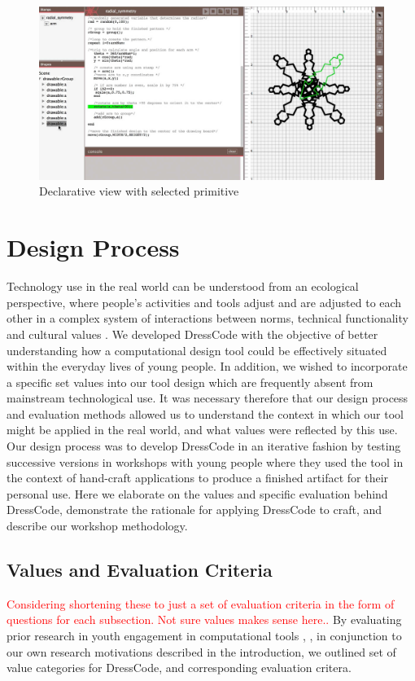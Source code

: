 \documentclass{sigchi}
\begin{document}
\begin{center}
\begin{figure}[h!]
\includegraphics[width=\columnwidth]{images/selection_mechanism.jpg}
\caption{Declarative view with selected primitive}
\label{fig:declarative_view}
\end{figure}
\end{center}
\vspace{-20pt}

\section{Design Process}
 Technology use in the real world can be understood from an ecological perspective, where people's activities and tools adjust and are adjusted to each other in a complex system of interactions between norms, technical functionality and cultural values \cite{information_ecologies}. We developed DressCode with the objective of better understanding how a computational design tool could be effectively situated within the everyday lives of young people. In addition, we wished to incorporate a specific set values into our tool design which are frequently absent from mainstream technological use. It was necessary therefore that our design process and evaluation methods allowed us to understand the context in which our tool might be applied in the real world, and what values were reflected by this use. Our design process was to develop DressCode in an iterative fashion by testing successive versions in workshops with young people where they used the tool in the context of hand-craft applications to produce a finished artifact for their personal use. Here we elaborate on the values and specific evaluation behind DressCode, demonstrate the rationale for applying DressCode to craft, and describe our workshop methodology.

\subsection{Values and Evaluation Criteria}
\textcolor{red}{Considering shortening these to just a set of evaluation criteria in the form of questions for each subsection. Not sure values makes sense here..}
By evaluating prior research in youth engagement in computational tools \cite{computational_thinking}, \cite{introductory_programming}, in conjunction to our own research motivations described in the introduction, we outlined set of value categories for DressCode, and corresponding evaluation critera.
\end{document}
